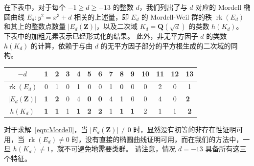 \documentclass[sigplan,10pt,nonacm,
screen]{acmart} \settopmatter{printfolios=true,printccs=false,printacmref=false}
\newcommand{\ab}[1]{\todo[color=green]{AB: #1}}
\newcommand{\QQ}{\mathbf{Q}}
\newcommand{\ZZ}{\mathbf{Z}}
\DeclareMathOperator{\rk}{rk}
\begin{document}
在下表中，对于每个 $-1 \geq d \geq -13$ 的整数 $d$，我们列出了与 $d$ 对应的 Mordell 椭圆曲线 $E_d : y^2 = x^3 + d$ 相关的上述量，即 $E_d$ 的 Mordell-Weil 群的秩 $\rk(E_d)$ 和其上的整数点数量 $|E_d(\ZZ)|$，以及二次域 $K_d=\QQ(\sqrt{d})$ 的类数 $h(K_d)$。
下表中的加粗元素表示已经形式化的结果。
此外，非无平方因子 $d$ 的类数 $h(K_d)$ 的计算，依赖于与由 $d$ 的无平方因子部分的平方根生成的二次域的同构。
\begin{center}
	\tabcolsep=0.15cm
	\begin{tabular}{c|c|c|c|c|c|c|c|c|c|c|c|c|c}
		$-d$          & 1                         & 2                         & 3 & 4 & 5                         & 6                         & 7 & 8 & 9 & 10 & 11 & 12 & 13                    \\ \hline
		$\rk(E_d)$     & 0                         & 1                         & 0 & 1 & 0                         & 0                         & 1 & 0 & 0 & 0  & 2  & 0  & 1              \\ \hline
		$|E_d(\ZZ)| $ & \textbf{1}                         & \textbf{2}                         & 0 & 4 & \textbf{0}                         & \textbf{0}                         & 4 & 1 & 0 & 0  & 4  & 0  & \textbf{2}\   \\ \hline
		$h(K_d)$      & \textbf{1}                         & \textbf{1}                         & 1 & \textbf{1} & \textbf{2}                         & \textbf{2}                         & 1 & \textbf{1} & \textbf{1} & 2  & 1  & 1  & \textbf{2}            \\
	\end{tabular}
\end{center}
对于求解~\eqref{eqn:Mordell}，当 $|E_d(\ZZ)|\not=0$ 时，显然没有初等的非存在性证明可用，当 $\rk(E_d)\not=0$ 时，没有直接的椭圆曲线证明可用，而在我们的方法中，一旦 $h(K_d)\not=1$，就不可避免地需要类群。
请注意，情况 $d=-13$ 具备所有这三个特征。

\end{document}
